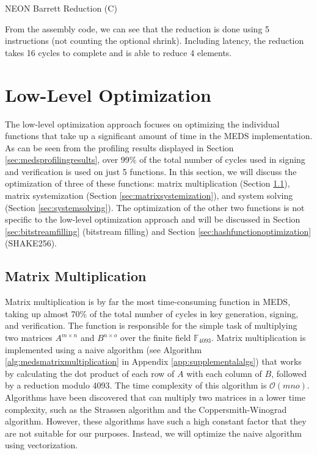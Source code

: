 \documentclass[11pt,a4paper]{report}
\theoremstyle{definition}
\begin{document}
\begin{algorithm}
  \caption{NEON Barrett Reduction (C)}
  \label{alg:neonbarretreductionc}
  
\end{algorithm}

\begin{algorithm}
  \caption{NEON Barrett Reduction (Assembly)}
  \label{alg:neonbarretreductionasm}
  Assembler}, style=ASMStyle]{code/barrett_reduce_asm.s}
\end{algorithm}

From the assembly code, we can see that the reduction is done using 5 instructions (not counting the optional shrink). Including latency, the reduction takes 16 cycles to complete and is able to reduce 4 elements.

\section{Low-Level Optimization}
\label{sec:lowleveloptimization}
The low-level optimization approach focuses on optimizing the individual functions that take up a significant amount of time in the MEDS implementation. As can be seen from the profiling results displayed in Section \ref{sec:medsprofilingresults}, over 99\% of the total number of cycles used in signing and verification is used on just 5 functions. In this section, we will discuss the optimization of three of these functions: matrix multiplication (Section \ref{sec:matrixmultiplication}), matrix systemization (Section \ref{sec:matrixsystemization}), and system solving (Section \ref{sec:systemsolving}). The optimization of the other two functions is not specific to the low-level optimization approach and will be discussed in Section \ref{sec:bitstreamfilling} (bitstream filling) and Section \ref{sec:hashfunctionoptimization} (SHAKE256).

\subsection{Matrix Multiplication}
\label{sec:matrixmultiplication}
Matrix multiplication is by far the most time-consuming function in MEDS, taking up almost 70\% of the total number of cycles in key generation, signing, and verification. The function is responsible for the simple task of multiplying two matrices $A^{m \times n}$ and $B^{n \times o}$ over the finite field $\mathbb{F}_{4093}$. Matrix multiplication is implemented using a naive algorithm (see Algorithm \ref{alg:medsmatrixmultiplication} in Appendix \ref{app:supplementalalgs}) that works by calculating the dot product of each row of $A$ with each column of $B$, followed by a reduction modulo 4093. The time complexity of this algorithm is $\mathcal{O}(mno)$. Algorithms have been discovered that can multiply two matrices in a lower time complexity, such as the Strassen algorithm and the Coppersmith-Winograd algorithm. However, these algorithms have such a high constant factor that they are not suitable for our purposes. Instead, we will optimize the naive algorithm using vectorization.
\end{document}

